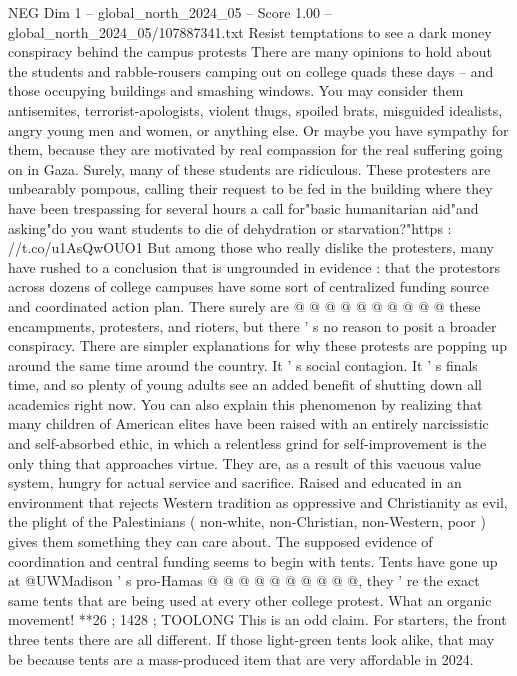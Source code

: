 \begin{textsample}{NEG Dim 1 – global\_north\_2024\_05 – Score 1.00 – global\_north\_2024\_05/107887341.txt}  \label{ex:f1_neg_053}
Resist temptations to see a dark money conspiracy behind the campus protests There are many opinions to hold about the students and rabble-rousers camping out on college quads these days -- and those occupying buildings and smashing windows.
You may consider them antisemites, terrorist-apologists, violent thugs, spoiled brats, misguided idealists, angry young men and women, or anything else.
Or maybe you have sympathy for them, because they are motivated by real compassion for the real suffering going on in Gaza.
Surely, many of these students are ridiculous.
These protesters are unbearably pompous, calling their request to be fed in the building where they have been trespassing for several hours a call for"basic humanitarian aid"and asking"do you want students to die of dehydration or starvation?"https : //t.co/u1AsQwOUO1 But among those who really dislike the protesters, many have rushed to a conclusion that is ungrounded in evidence : that the protestors across dozens of college campuses have some sort of centralized funding source and coordinated action plan.
There surely are @ @ @ @ @ @ @ @ @ @ these encampments, protesters, and rioters, but there ' s no reason to posit a broader conspiracy.
There are simpler explanations for why these protests are popping up around the same time around the country.
It ' s social contagion.
It ' s finals time, and so plenty of young adults see an added benefit of shutting down all academics right now.
You can also explain this phenomenon by realizing that many children of American elites have been raised with an entirely narcissistic and self-absorbed ethic, in which a relentless grind for self-improvement is the only thing that approaches virtue.
They are, as a result of this vacuous value system, hungry for actual service and sacrifice.
Raised and educated in an environment that rejects Western tradition as oppressive and Christianity as evil, the plight of the Palestinians ( non-white, non-Christian, non-Western, poor ) gives them something they can care about.
The supposed evidence of coordination and central funding seems to begin with tents.
Tents have gone up at @UWMadison ' s pro-Hamas @ @ @ @ @ @ @ @ @ @, they ' re the exact same tents that are being used at every other college protest.
What an organic movement! **26 ; 1428 ; TOOLONG This is an odd claim.
For starters, the front three tents there are all different.
If those light-green tents look alike, that may be because tents are a mass-produced item that are very affordable in 2024.

\end{textsample}
